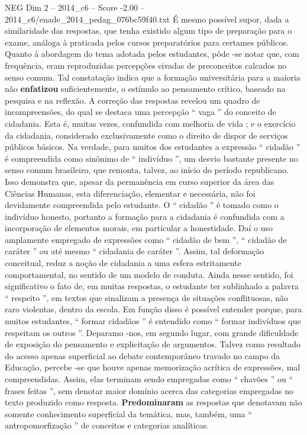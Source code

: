 \begin{textsample}{NEG Dim 2 – 2014\_c6 – Score -2.00 – 2014\_c6/enade\_2014\_pedag\_076bc59f40.txt}
É mesmo possível supor, dada a similaridade das respostas, que tenha existido algum tipo de preparação para o exame, análoga à praticada pelos cursos preparatórios para certames públicos.
Quanto à abordagem do tema adotada pelos estudantes, pôde -se notar que, com frequência, eram reproduzidas percepções eivadas de preconceitos calcados no senso comum.
Tal constatação indica que a formação universitária para a maioria não \textbf{enfatizou} suficientemente, o estímulo ao pensamento crítico, baseado na pesquisa e na reflexão.
A correção das respostas revelou um quadro de incompreensões, do qual se destaca uma percepção “ vaga ” do conceito de cidadania.
Esta é, muitas vezes, confundida com melhoria de vida ; e o exercício da cidadania, considerado exclusivamente como o direito de dispor de serviços públicos básicos.
Na verdade, para muitos dos estudantes a expressão “ cidadão ” é compreendida como sinônimo de “ indivíduo ”, um desvio bastante presente no senso comum brasileiro, que remonta, talvez, ao início do período republicano.
Isso demonstra que, apesar da permanência em curso superior da área das Ciências Humanas, esta diferenciação, elementar e necessária, não foi devidamente compreendida pelo estudante.
O “ cidadão ” é tomado como o indivíduo honesto, portanto a formação para a cidadania é confundida com a incorporação de elementos morais, em particular a honestidade.
Daí o uso amplamente empregado de expressões como “ cidadão de bem ”, “ cidadão de caráter ” ou até mesmo “ cidadania de caráter ”.
Assim, tal deformação conceitual, reduz a noção de cidadania a uma esfera estritamente comportamental, no sentido de um modelo de conduta.
Ainda nesse sentido, foi significativo o fato de, em muitas respostas, o estudante ter sublinhado a palavra “ respeito ”, em textos que sinalizam a presença de situações conflituosas, não raro violentas, dentro da escola.
Em função disso é possível entender porque, para muitos estudantes, “ formar cidadãos ” é entendido como “ formar indivíduos que respeitam os outros ”.
Deparamo -nos, em segundo lugar, com grande dificuldade de exposição do pensamento e explicitação de argumentos.
Talvez como resultado do acesso apenas superficial ao debate contemporâneo travado no campo da Educação, percebe -se que houve apenas memorização acrítica de expressões, mal compreendidas.
Assim, elas terminam sendo empregadas como “ chavões ” ou “ frases feitas ”, sem denotar maior domínio acerca das categorias empregadas no texto produzido como resposta. \textbf{Predominaram} as respostas que denotavam não somente conhecimento superficial da temática, mas, também, uma “ antropomorfização ” de conceitos e categorias analíticas.

\end{textsample}
